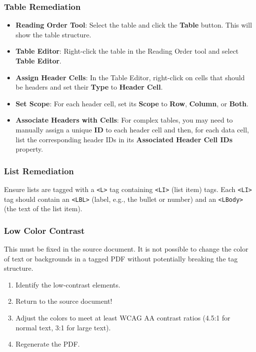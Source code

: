 \subsubsection{Table Remediation}
\label{ssubsec:table-remediation}
\begin{itemize}
	\item \textbf{Reading Order Tool}: Select the table and click the \textbf{Table} button. This will show the table structure.
	\item \textbf{Table Editor}: Right-click the table in the Reading Order tool and select \textbf{Table Editor}.
	\item \textbf{Assign Header Cells}: In the Table Editor, right-click on cells that should be headers and set their \textbf{Type} to \textbf{Header Cell}.
	\item \textbf{Set Scope}: For each header cell, set its \textbf{Scope} to \textbf{Row}, \textbf{Column}, or \textbf{Both}.
	\item \textbf{Associate Headers with Cells}: For complex tables, you may need to manually assign a unique \textbf{ID} to each header cell and then, for each data cell, list the corresponding header IDs in its \textbf{Associated Header Cell IDs} property.
\end{itemize}

\subsubsection{List Remediation}
\label{ssubsec:list-remediation}
Ensure lists are tagged with a \texttt{<L>} tag containing \texttt{<LI>} (list item) tags. Each \texttt{<LI>} tag should contain an \texttt{<LBL>} (label, e.g., the bullet or number) and an \texttt{<LBody>} (the text of the list item).

\subsubsection{Low Color Contrast}
\label{ssubsec:low-color-contrast-remediation}
This must be fixed in the source document. It is not possible to change the color of text or backgrounds in a tagged PDF without potentially breaking the tag structure.
\begin{enumerate}
	\item Identify the low-contrast elements.
	\item Return to the source document!
	\item Adjust the colors to meet at least WCAG AA contrast ratios (4.5:1 for normal text, 3:1 for large text).
	\item Regenerate the PDF.
\end{enumerate}

